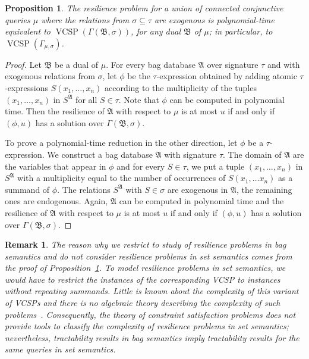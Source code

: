 \documentclass[nonacm]{acmart}
\newcommand{\bA}{{\mathfrak A}}
\newcommand{\bB}{{\mathfrak B}}
\DeclareMathOperator{\VCSP}{VCSP}
\newtheorem{proposition}[theorem]{Proposition}
\newtheorem{remark}[theorem]{Remark}
\begin{document}
\begin{proposition}
\label{prop:connection}
The resilience problem for a 
union of connected conjunctive queries $\mu$
where the relations
from $\sigma \subseteq \tau$
are exogenous
is polynomial-time equivalent to 
$\VCSP(\Gamma(\bB,\sigma))$, for any dual $\bB$ of $\mu$; in particular, to  $\VCSP(\Gamma_{\mu,\sigma})$. 
\end{proposition}
\begin{proof}
Let $\bB$ be a dual of $\mu$.
For every  bag database $\bA$ over  signature $\tau$ and with exogenous relations from $\sigma$,
let $\phi$ 
be the 
$\tau$-expression 
obtained by adding atomic $\tau$-expressions $S(x_1,\dots,x_n)$ according to the multiplicity of the tuples $(x_1,\dots,x_n)$ in $S^{\bA}$ for all $S \in \tau$. 
Note that $\phi$ can be computed in polynomial time.
Then the resilience of $\bA$ with respect to $\mu$
is at most $u$ if and only if $(\phi,u)$ has a solution over 
$\Gamma(\bB, \sigma)$.

To prove a polynomial-time reduction in the other direction,
let $\phi$ be a $\tau$-expression. We construct a  bag database $\bA$ with signature $\tau$.
 The domain of $\bA$ are the variables that appear in $\phi$ and for every $S\in \tau$, we put a tuple $(x_1, \dots, x_n)$ in $S^{\bA}$ with a multiplicity
equal to the number of occurrences of $S(x_1, \dots x_n)$ 
as a summand  of $\phi$.
The relations $S^{\bA}$ with $S \in \sigma$ are exogenous in $\bA$, the remaining ones are endogenous. 
Again, $\bA$ can be computed in polynomial time and the resilience of $\bA$ with respect to $\mu$ is at most $u$ if and only if $(\phi,u)$ has a solution over $\Gamma(\bB, \sigma)$.
\end{proof}

\begin{remark} \label{rem:set}
The reason why we restrict to study of resilience problems in bag semantics and do not consider resilience problems in set semantics comes from the proof of Proposition~\ref{prop:connection}. To model resilience problems in set semantics, we would have to restrict the instances of the corresponding VCSP to instances without repeating summands. Little is known about the complexity of this variant of VCSPs and there is no algebraic theory describing the complexity of such problems~\cite{GeorgePersCom}. Consequently, the theory of constraint satisfaction problems does not provide tools to classify the complexity of resilience problems in set semantics; nevertheless, tractability results in bag semantics imply tractability results for the same queries in set semantics. 
\end{remark}
\end{document}
